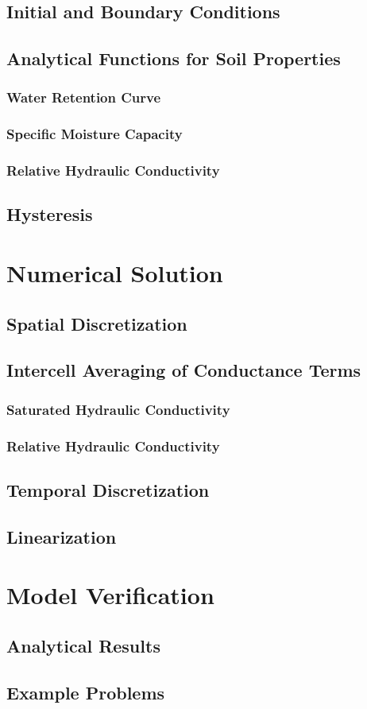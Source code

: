 \documentclass[fleqn]{article}
\begin{document}
\subsection{Initial and Boundary Conditions}

\subsection{Analytical Functions for Soil Properties}
\subsubsection*{Water Retention Curve}
\subsubsection*{Specific Moisture Capacity}
\subsubsection*{Relative Hydraulic Conductivity}
\subsection{Hysteresis}

\section{Numerical Solution}
\subsection{Spatial Discretization}
\subsection{Intercell Averaging of Conductance Terms}\label{sec-cond-avg}
\subsubsection*{Saturated Hydraulic Conductivity}
\subsubsection*{Relative Hydraulic Conductivity}
\subsection{Temporal Discretization}
\subsection{Linearization}


\section{Model Verification}
\subsection{Analytical Results}
\subsection{Example Problems}
\end{document}
